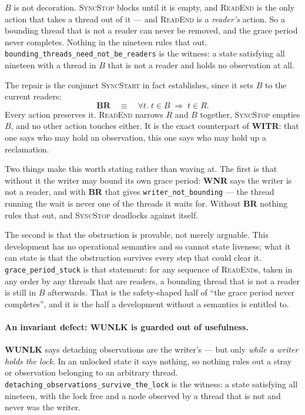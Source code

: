 $B$ is not decoration.  \textsc{SyncStop} blocks until it is empty, and
\textsc{ReadEnd} is the only action that takes a thread out of it --- and
\textsc{ReadEnd} is a \emph{reader's} action.  So a bounding thread that is not
a reader can never be removed, and the grace period never completes.  Nothing in
the nineteen rules that out.
\texttt{bounding\_threads\_need\_not\_be\_readers} is the witness: a state
satisfying all nineteen with a thread in $B$ that is not a reader and holds no
observation at all.

The repair is the conjunct \textsc{SyncStart} in fact establishes, since it sets
$B$ to the current readers:
\[
  \textbf{BR} \quad\equiv\quad \forall t.\; t \in B \;\Rightarrow\; t \in R .
\]
Every action preserves it.  \textsc{ReadEnd} narrows $R$ and $B$ together,
\textsc{SyncStop} empties $B$, and no other action touches either.  It is the
exact counterpart of \textbf{WITR}: that one says who may hold an observation,
this one says who may hold up a reclamation.

Two things make this worth stating rather than waving at.  The first is that
without it the writer may bound its own grace period: \textbf{WNR} says the
writer is not a reader, and with \textbf{BR} that gives
\texttt{writer\_not\_bounding} --- the thread running the wait is never one of
the threads it waits for.  Without \textbf{BR} nothing rules that out, and
\textsc{SyncStop} deadlocks against itself.

The second is that the obstruction is provable, not merely arguable.  This
development has no operational semantics and so cannot state liveness; what it
can state is that the obstruction survives every step that could clear it.
\texttt{grace\_period\_stuck} is that statement: for any sequence of
\textsc{ReadEnd}s, taken in any order by any threads that are readers, a
bounding thread that is not a reader is still in $B$ afterwards.  That is the
safety-shaped half of ``the grace period never completes'', and it is the half a
development without a semantics is entitled to.

\paragraph{An invariant defect: WUNLK is guarded out of usefulness.}
\label{sec:defect-wunlkw}
\textbf{WUNLK} says detaching observations are the writer's --- but only
\emph{while a writer holds the lock}.  In an unlocked state it says nothing, so
nothing rules out a stray \unlk{} or \frbl{} observation belonging to an
arbitrary thread.  \texttt{detaching\_observations\_survive\_the\_lock} is the
witness: a state satisfying all nineteen, with the lock free and a node observed
\unlk{} by a thread that is not and never was the writer.

